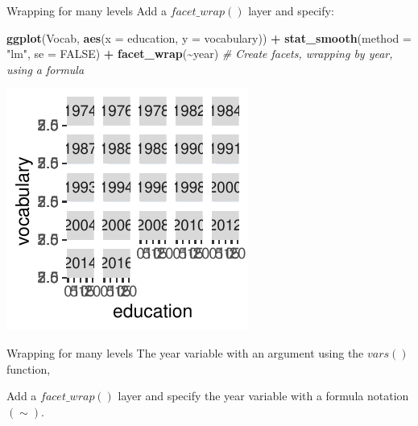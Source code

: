 \documentclass[
  ignorenonframetext,
]{beamer}
\newenvironment{Shaded}{\begin{snugshade}}{\end{snugshade}}
\newcommand{\AttributeTok}[1]{\textcolor[rgb]{0.13,0.29,0.53}{#1}}
\newcommand{\CommentTok}[1]{\textcolor[rgb]{0.56,0.35,0.01}{\textit{#1}}}
\newcommand{\ConstantTok}[1]{\textcolor[rgb]{0.56,0.35,0.01}{#1}}
\newcommand{\FunctionTok}[1]{\textcolor[rgb]{0.13,0.29,0.53}{\textbf{#1}}}
\newcommand{\NormalTok}[1]{#1}
\newcommand{\SpecialCharTok}[1]{\textcolor[rgb]{0.81,0.36,0.00}{\textbf{#1}}}
\newcommand{\StringTok}[1]{\textcolor[rgb]{0.31,0.60,0.02}{#1}}
\begin{document}
\begin{frame}[fragile]{Wrapping for many levels}
\label{wrapping-for-many-levels-3}
Add a \(facet\_wrap()\) layer and specify:


\begin{Shaded}
\begin{Highlighting}[]
\FunctionTok{ggplot}\NormalTok{(Vocab, }\FunctionTok{aes}\NormalTok{(}\AttributeTok{x =}\NormalTok{ education, }\AttributeTok{y =}\NormalTok{ vocabulary)) }\SpecialCharTok{+} \FunctionTok{stat\_smooth}\NormalTok{(}\AttributeTok{method =} \StringTok{"lm"}\NormalTok{,}
    \AttributeTok{se =} \ConstantTok{FALSE}\NormalTok{) }\SpecialCharTok{+} \FunctionTok{facet\_wrap}\NormalTok{(}\SpecialCharTok{\textasciitilde{}}\NormalTok{year)  }\CommentTok{\# Create facets, wrapping by year, using a formula}
\end{Highlighting}
\end{Shaded}

\begin{center}\includegraphics[width=0.5\linewidth]{Figs/unnamed-chunk-94-1} \end{center}
\end{frame}

\begin{frame}{Wrapping for many levels}
\label{wrapping-for-many-levels-4}
The year variable with an argument using the \(vars()\) function,

Add a \(facet\_wrap()\) layer and specify the year variable with a
formula notation \((\sim)\).
\end{frame}
\end{document}
